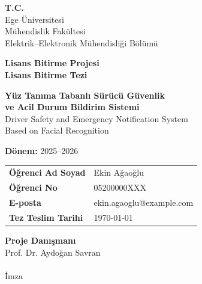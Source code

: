 \begin{titlepage}
\begin{center}

{\large\bfseries T.C.}\\[6pt]
{\large Ege Üniversitesi}\\[2pt]
{\large Mühendislik Fakültesi}\\[2pt]
{\large Elektrik--Elektronik Mühendisliği Bölümü}

\vspace{2.2cm}

{\Large\bfseries Lisans Bitirme Projesi}\\[6pt]
{\Large\bfseries Lisans Bitirme Tezi}

\vspace{1.6cm}

{\LARGE\bfseries Yüz Tanıma Tabanlı Sürücü Güvenlik\\[4pt] ve Acil Durum Bildirim Sistemi}\\[10pt]
{\large Driver Safety and Emergency Notification System\\Based on Facial Recognition}

\vspace{1.4cm}

{\bfseries Dönem:} 2025--2026

\vfill

\begin{tabular}{ll}
\bfseries Öğrenci Ad Soyad & Ekin Ağaoğlu \\
\bfseries Öğrenci No       & 05200000XXX  \\  %
\bfseries E-posta          & ekin.agaoglu@example.com \\  %
\bfseries Tez Teslim Tarihi & \today \\
\end{tabular}

\vspace{1.8cm}

\begin{flushleft}
{\bfseries Proje Danışmanı}\\[2pt]
Prof. Dr. Aydoğan Savran\\[14pt]
\hrulefill\\[2pt]
İmza
\end{flushleft}

\end{center}
\end{titlepage}
\cleardoublepage
